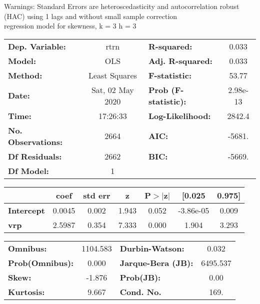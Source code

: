 Warnings: \newline
 [1] Standard Errors are heteroscedasticity and autocorrelation robust (HAC) using 1 lags and without small sample correction\\ 

regression model for skewness, k = 3 h = 3\begin{center}
\begin{tabular}{lclc}
\toprule
\textbf{Dep. Variable:}    &       rtrn       & \textbf{  R-squared:         } &     0.033   \\
\textbf{Model:}            &       OLS        & \textbf{  Adj. R-squared:    } &     0.033   \\
\textbf{Method:}           &  Least Squares   & \textbf{  F-statistic:       } &     53.77   \\
\textbf{Date:}             & Sat, 02 May 2020 & \textbf{  Prob (F-statistic):} &  2.98e-13   \\
\textbf{Time:}             &     17:26:33     & \textbf{  Log-Likelihood:    } &    2842.4   \\
\textbf{No. Observations:} &        2664      & \textbf{  AIC:               } &    -5681.   \\
\textbf{Df Residuals:}     &        2662      & \textbf{  BIC:               } &    -5669.   \\
\textbf{Df Model:}         &           1      & \textbf{                     } &             \\
\bottomrule
\end{tabular}
\begin{tabular}{lcccccc}
                   & \textbf{coef} & \textbf{std err} & \textbf{z} & \textbf{P$> |$z$|$} & \textbf{[0.025} & \textbf{0.975]}  \\
\midrule
\textbf{Intercept} &       0.0045  &        0.002     &     1.943  &         0.052        &    -3.86e-05    &        0.009     \\
\textbf{vrp}       &       2.5987  &        0.354     &     7.333  &         0.000        &        1.904    &        3.293     \\
\bottomrule
\end{tabular}
\begin{tabular}{lclc}
\textbf{Omnibus:}       & 1104.583 & \textbf{  Durbin-Watson:     } &    0.032  \\
\textbf{Prob(Omnibus):} &   0.000  & \textbf{  Jarque-Bera (JB):  } & 6495.537  \\
\textbf{Skew:}          &  -1.876  & \textbf{  Prob(JB):          } &     0.00  \\
\textbf{Kurtosis:}      &   9.667  & \textbf{  Cond. No.          } &     169.  \\
\bottomrule
\end{tabular}
\end{center}

